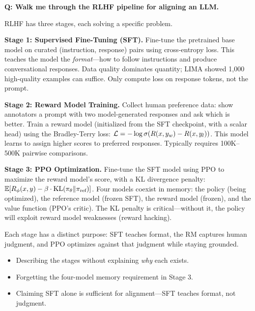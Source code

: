 \begin{interviewq}
\textbf{Q: Walk me through the RLHF pipeline for aligning an LLM.}

 \quad {} \quad \badgefreq{\freqhigh}

\stronganswer

RLHF has three stages, each solving a specific problem.

\textbf{Stage 1: Supervised Fine-Tuning (SFT).} Fine-tune the pretrained base model on curated (instruction, response) pairs using cross-entropy loss. This teaches the model the \textit{format}---how to follow instructions and produce conversational responses. Data quality dominates quantity; LIMA showed 1,000 high-quality examples can suffice. Only compute loss on response tokens, not the prompt.

\textbf{Stage 2: Reward Model Training.} Collect human preference data: show annotators a prompt with two model-generated responses and ask which is better. Train a reward model (initialized from the SFT checkpoint, with a scalar head) using the Bradley-Terry loss: $\mathcal{L} = -\log\sigma(R(x,y_w) - R(x,y_l))$. This model learns to assign higher scores to preferred responses. Typically requires 100K--500K pairwise comparisons.

\textbf{Stage 3: PPO Optimization.} Fine-tune the SFT model using PPO to maximize the reward model's score, with a KL divergence penalty: $\operatorname{\mathbb{E}}[R_\phi(x,y) - \beta \cdot \operatorname{KL}(\pi_\theta \| \pi_{\text{ref}})]$. Four models coexist in memory: the policy (being optimized), the reference model (frozen SFT), the reward model (frozen), and the value function (PPO's critic). The KL penalty is critical---without it, the policy will exploit reward model weaknesses (reward hacking).

Each stage has a distinct purpose: SFT teaches format, the RM captures human judgment, and PPO optimizes against that judgment while staying grounded.

\redflags
\begin{itemize}
    \item Describing the stages without explaining \textit{why} each exists.
    \item Forgetting the four-model memory requirement in Stage 3.
    \item Claiming SFT alone is sufficient for alignment---SFT teaches format, not judgment.
\end{itemize}



\end{interviewq}

